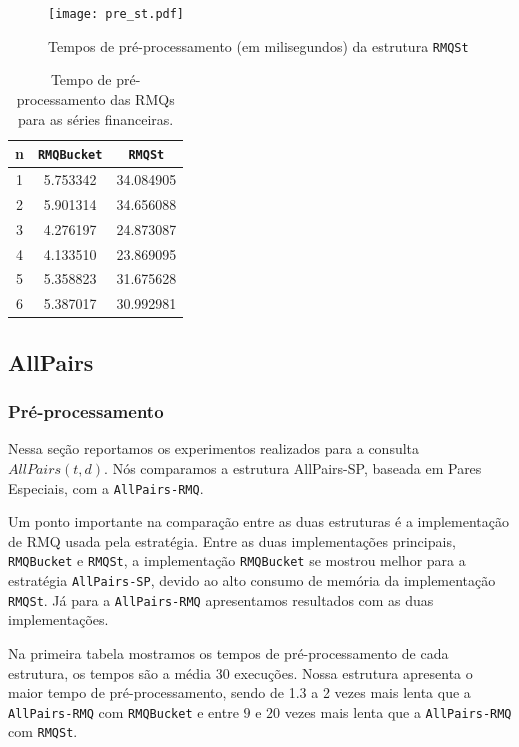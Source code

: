 \documentclass[dissertacao, brazil]{ThesisPUC}
\begin{document}
\begin{figure}[htp]
\begin{center}
\texttt{[image: pre\_st.pdf]}
\caption{Tempos de pré-processamento (em milisegundos) da estrutura {\tt RMQSt} }
\label{fig:pre_st}
\end{center}
\end{figure}

\begin{table}
\small
\begin{center}
\begin{tabular}{|c|c|c|}
\hline
\textbf{n} & \textbf{ {\tt RMQBucket} } & \textbf{ {\tt RMQSt}}\\
\hline
1 & 5.753342 & 34.084905\\
\hline
2 & 5.901314 & 34.656088\\
\hline
3 & 4.276197 & 24.873087\\
\hline 
4 & 4.133510 & 23.869095\\
\hline
5 & 5.358823 & 31.675628\\
\hline
6 & 5.387017 & 30.992981\\
\hline
\end{tabular}
\end{center}
\label{tab:pre_series}
\caption{Tempo de pré-processamento das RMQs para as séries financeiras.}
\normalsize
\end{table}


\subsection{AllPairs}

\subsubsection{Pré-processamento}
Nessa seção reportamos os experimentos realizados para a consulta $AllPairs(t,d)$.
Nós comparamos a estrutura AllPairs-SP, baseada em Pares Especiais, com a  {\tt AllPairs-RMQ}.

Um ponto importante na comparação entre as duas estruturas é a implementação de RMQ usada pela estratégia. 
Entre as duas implementações principais, {\tt RMQBucket} e {\tt RMQSt}, a implementação {\tt RMQBucket} se mostrou melhor para 
a estratégia {\tt AllPairs-SP}, devido ao alto consumo de memória da implementação {\tt RMQSt}.
Já para a {\tt AllPairs-RMQ} apresentamos resultados com as duas implementações.

Na primeira tabela mostramos os tempos de pré-processamento de cada estrutura, os tempos são a média 30 execuções.
Nossa estrutura apresenta o maior tempo de pré-processamento,  sendo de 1.3 a 2 vezes mais lenta que a {\tt AllPairs-RMQ}
 com {\tt RMQBucket} e entre $9$ e $20$ vezes mais lenta que a {\tt AllPairs-RMQ}  com {\tt RMQSt}.
\end{document}
